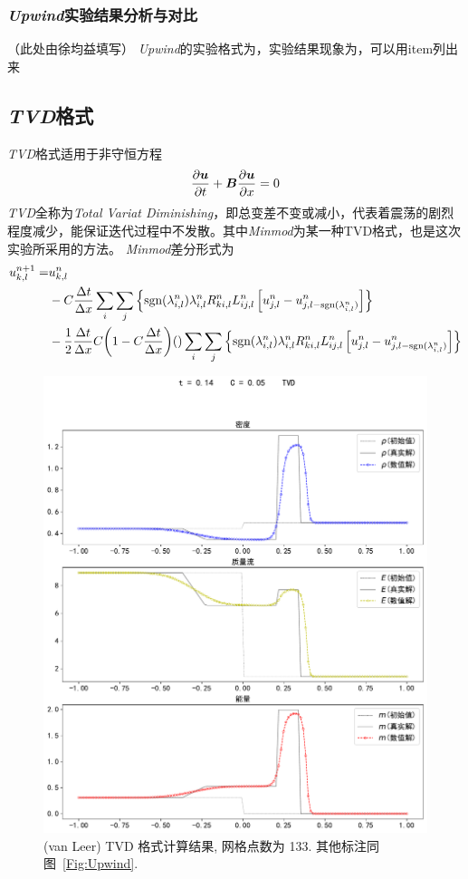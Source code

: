\documentclass[10.5pt
]{article}
\begin{document}
\subsubsection{\textit{Upwind}实验结果分析与对比}
（此处由徐均益填写）
\textit{Upwind}的实验格式为，实验结果现象为，可以用item列出来
\subsection{\textit{TVD}格式}
\textit{TVD}格式适用于非守恒方程
\begin{align}
\pdv{\vb*u}{t} + \vb*B \pdv{\vb*u}{x} = 0
\end{align}
\textit{TVD}全称为\textit{Total Variat Diminishing}，即总变差不变或减小，代表着震荡的剧烈程度减少，能保证迭代过程中不发散。其中\textit{Minmod}为某一种TVD格式，也是这次实验所采用的方法。
\textit{Minmod}差分形式为
\begin{align}
u_{k,l}^{n+1} =& u_{k,l}^n \nonumber\\
& - C\frac{\Delta t}{\Delta x} \sum_i \sum_j \left\{\text{sgn}(\lambda_{i,l}^n)
 \lambda_{i,l}^n R_{ki,l}^n L_{ij,l}^n \left[u_{j,l}^n - u_{j,l-\text{sgn}(\lambda_{i,l}^n)}^n\right]\right\}\\
& - \frac{1}{2}\frac{\Delta t}{\Delta x}C\qty(1-C\frac{\Delta t}{\Delta x})() \sum_i \sum_j \left\{\text{sgn}(\lambda_{i,l}^n)
 \lambda_{i,l}^n R_{ki,l}^n L_{ij,l}^n \left[u_{j,l}^n - u_{j,l-\text{sgn}(\lambda_{i,l}^n)}^n\right]\right\}
\end{align}
\begin{figure}
\begin{center}
\includegraphics[width=.85\textwidth]{figures/limiter133.pdf}
\caption{(van Leer) TVD 格式计算结果, 网格点数为 133. 其他标注同图~\ref{Fig:Upwind}.}\label{Fig:vanLeerA}
\end{center}
\end{figure}
\end{document}
